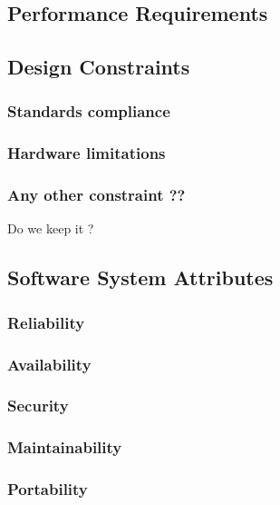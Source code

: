 \subsection{Performance Requirements}

\subsection{Design Constraints}
\subsubsection{Standards compliance}
\subsubsection{Hardware limitations}
\subsubsection{Any other constraint ??}
Do we keep it ?
\subsection{Software System Attributes}
\subsubsection{Reliability}
\subsubsection{Availability}
\subsubsection{Security}
\subsubsection{Maintainability}
\subsubsection{Portability}
